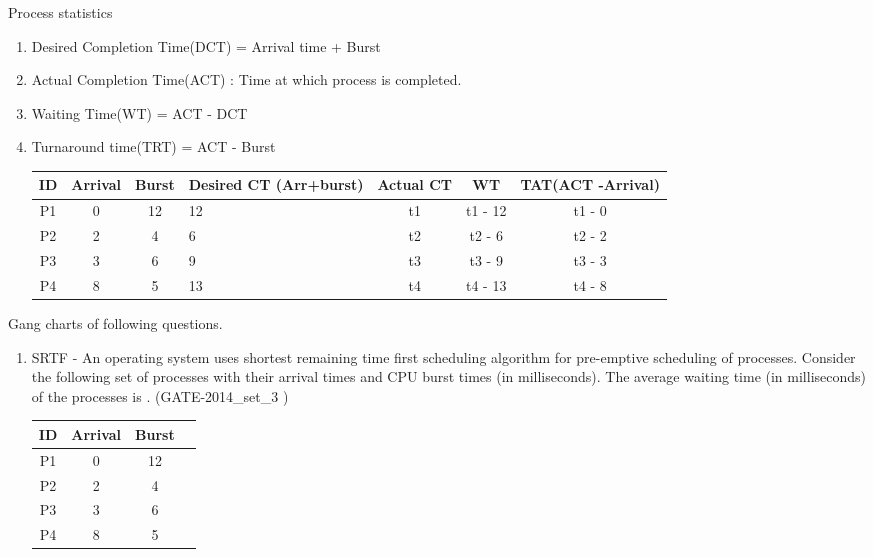 \begin{enumerate}
  \begin{minipage}{\linewidth}
  \item Process statistics
  \begin{enumerate}
    \item Desired Completion Time(DCT) = Arrival time + Burst
    \item Actual Completion Time(ACT) : Time at which process is completed.
    \item Waiting Time(WT) = ACT - DCT
    \item Turnaround time(TRT) = ACT - Burst

    \begin{myTableStyle}
    \begin{center}
    \begin{tabular}{ |c|c|c|M{1.8cm}|c|c|c| } \hline
          ID & Arrival &  Burst & Desired CT (Arr+burst) & Actual CT & WT & TAT(ACT -Arrival)  \\ \hline
          P1 & 0 & 12 & 12 & t1 & t1 - 12 & t1 - 0      \\ \hline
          P2 & 2 & 4  & 6  & t2 & t2 - 6  & t2 - 2     \\ \hline
          P3 & 3 & 6  & 9  & t3 & t3 - 9  & t3 - 3     \\ \hline
          P4 & 8 & 5  & 13 & t4 & t4 - 13 & t4 - 8      \\ \hline
    \end{tabular}
    \end{center}
  \end{myTableStyle}
  \vspace{0.08in}
  \end{enumerate}
  \end{minipage}


  \item Gang charts of following questions.
        \begin{enumerate}
          \item SRTF - An operating system uses shortest remaining time first scheduling algorithm for pre-emptive
            scheduling of processes. Consider the following set of processes with their arrival times and
            CPU burst times (in milliseconds). The average waiting time (in milliseconds) of the
            processes is \fillin[5.5]. (GATE-2014\_set\_3 )

    \begin{myTableStyle}
    \begin{center}
    \begin{tabular}{ |c|c|c|c| } \hline
          ID & Arrival &  Burst     \\ \hline
          P1 & 0 & 12     \\ \hline
          P2 & 2 & 4     \\ \hline
          P3 & 3 & 6     \\ \hline
          P4 & 8 & 5      \\ \hline
    \end{tabular}
    \end{center}
  \end{myTableStyle}
  \vspace{0.08in}


\end{enumerate}
\end{enumerate}
